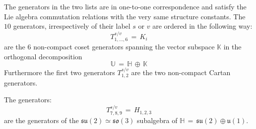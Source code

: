 \documentclass[10pt,a4paper]{article}
\newcommand{\so}{\mathfrak{so}}
\newcommand{\su}{\mathfrak{su}}
\newcommand{\uu}{\mathfrak{u}}
\begin{document}
The generators in the two lists are in one-to-one correspondence and satisfy the Lie algebra commutation relations with the very same structure constants. The $10$ generators, irrespectively of their label $s$ or $v$ are ordered in the following way:
\begin{equation}\label{cosettico}
  T^{s/v}_{1,\dots,6} \,=\,K_{i}
\end{equation}
are the $6$ non-compact coset generators spanning the vector subspace $\mathbb{K}$ in the orthogonal decomposition
\begin{equation}\label{trappolatura}
  \mathbb{U} \, = \, \mathbb{H} \, \oplus \, \mathbb{K}
\end{equation}
Furthermore the first two generators $T^{s/v}_{1,2}$ are the two non-compact Cartan generators.
\par
The generators:
\begin{equation}\label{hattico}
  T^{s/v}_{7,8,9} \,=\,H_{1,2,3}
\end{equation}
are the generators of the $\su(2)\simeq\so(3)$ subalgebra of $\mathbb{H}\, = \, \su(2)\oplus \uu(1)$.
\end{document}
